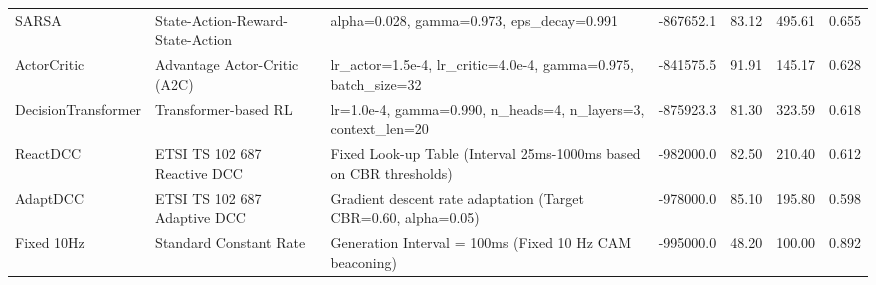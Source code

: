 \begin{table}[t]
{\begin{tabular}{l l p{6.8cm} r r r r}
SARSA & State-Action-Reward-State-Action & \small{alpha=0.028, gamma=0.973, eps\_decay=0.991} & -867652.1 & 83.12 & 495.61 & 0.655 \\
ActorCritic & Advantage Actor-Critic (A2C) & \small{lr\_actor=1.5e-4, lr\_critic=4.0e-4, gamma=0.975, batch\_size=32} & -841575.5 & 91.91 & 145.17 & 0.628 \\
DecisionTransformer & Transformer-based RL & \small{lr=1.0e-4, gamma=0.990, n\_heads=4, n\_layers=3, context\_len=20} & -875923.3 & 81.30 & 323.59 & 0.618 \\
ReactDCC & ETSI TS 102 687 Reactive DCC & \small{Fixed Look-up Table (Interval 25ms-1000ms based on CBR thresholds)} & -982000.0 & 82.50 & 210.40 & 0.612 \\
AdaptDCC & ETSI TS 102 687 Adaptive DCC & \small{Gradient descent rate adaptation (Target CBR=0.60, alpha=0.05)} & -978000.0 & 85.10 & 195.80 & 0.598 \\
Fixed 10Hz & Standard Constant Rate & \small{Generation Interval = 100ms (Fixed 10 Hz CAM beaconing)} & -995000.0 & 48.20 & 100.00 & 0.892 \\
\bottomrule
\end{tabular}
}
\end{table}

